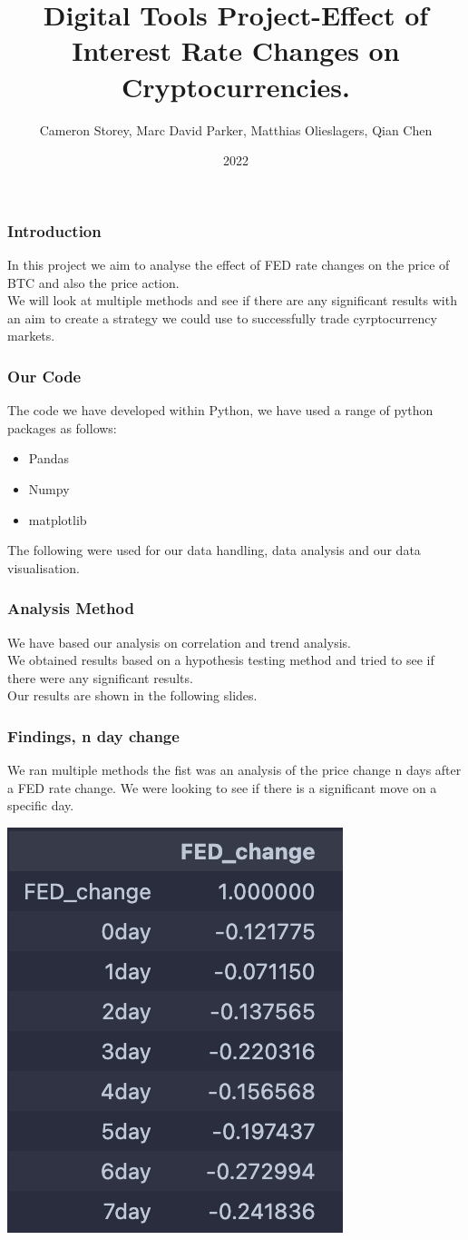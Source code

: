 \documentclass{beamer}
\title{Digital Tools Project-Effect of Interest Rate Changes on Cryptocurrencies.}
\author{Cameron Storey, Marc David Parker, Matthias Olieslagers, Qian Chen}
\institute{UZH Digital Tools for Finance}
\date{2022}
\begin{document}
\frame{\titlepage}

\begin{frame}
\frametitle{Introduction}
In this project we aim to analyse the effect of FED rate changes on the price of BTC and also the price action.\\


We will look at multiple methods and see if there are any significant results with an aim to create a strategy we could use to successfully trade cyrptocurrency markets.
\end{frame}

\begin{frame}
    \frametitle{Our Code}
    The code we have developed within Python, we have used a range of python packages as follows:
    \begin{itemize}
    \item Pandas
    \item Numpy
    \item matplotlib
\end{itemize}
The following were used for our data handling, data analysis and our data visualisation.
\end{frame}
\begin{frame}
\frametitle{Analysis Method}
We have based our analysis on correlation and trend analysis.\\

We obtained results based on a hypothesis testing method and tried to see if there were any significant results.\\

Our results are shown in the following slides.
\end{frame}
\begin{frame}
    \frametitle{Findings, n day change}
We ran multiple methods the fist was an analysis of the price change n days after a FED rate change. We were looking to see if there is a significant move on a specific day. \\
\begin{center}
    \includegraphics{research_project/text/paper/1.png}
\end{center}


\end{frame}
\end{document}
